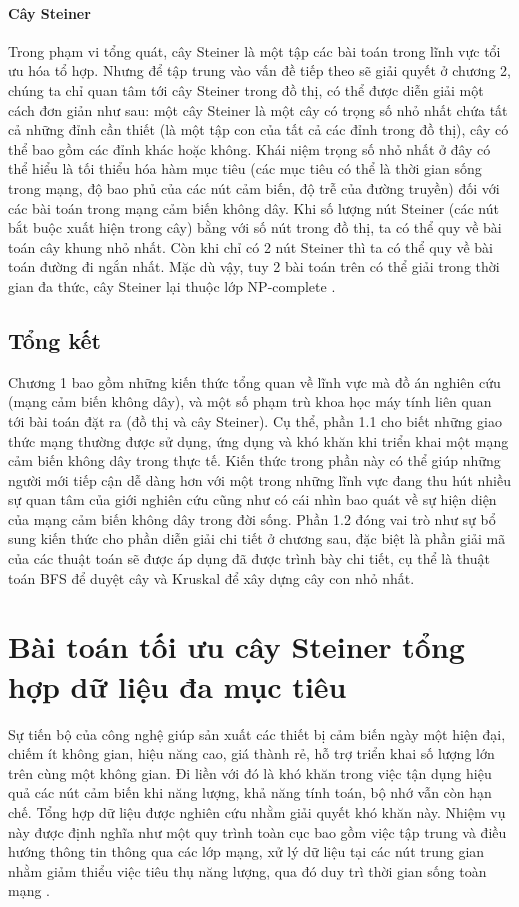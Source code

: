 \documentclass{hust}
\begin{document}
\subsubsection{Cây Steiner}
Trong phạm vi tổng quát, cây Steiner là một tập các bài toán trong lĩnh vực tổi ưu hóa tổ hợp. Nhưng để tập trung vào vấn đề tiếp theo sẽ giải quyết ở chương 2, chúng ta chỉ quan tâm tới cây Steiner trong đồ thị, có thể được diễn giải một cách đơn giản như sau: một cây Steiner là một cây có trọng số nhỏ nhất chứa tất cả những đỉnh cần thiết (là một tập con của tất cả các đỉnh trong đồ thị), cây có thể bao gồm các đỉnh khác hoặc không. Khái niệm trọng số nhỏ nhất ở đây có thể hiểu là tối thiểu hóa hàm mục tiêu (các mục tiêu có thể là thời gian sống trong mạng, độ bao phủ của các nút cảm biến, độ trễ của đường truyền) đối với các bài toán trong mạng cảm biến không dây. Khi số lượng nút Steiner (các nút bắt buộc xuất hiện trong cây) bằng với số nút trong đồ thị, ta có thể quy về bài toán cây khung nhỏ nhất. Còn khi chỉ có 2 nút Steiner thì ta có thể quy về bài toán đường đi ngắn nhất. Mặc dù vậy, tuy 2 bài toán trên có thể giải trong thời gian đa thức, cây Steiner lại thuộc lớp NP-complete \cite{karp1972reducibility}.

\section{Tổng kết}
Chương 1 bao gồm những kiến thức tổng quan về lĩnh vực mà đồ án nghiên cứu (mạng cảm biến không dây), và một số phạm trù khoa học máy tính liên quan tới bài toán đặt ra (đồ thị và cây Steiner). Cụ thể, phần 1.1 cho biết những giao thức mạng thường được sử dụng, ứng dụng và khó khăn khi triển khai một mạng cảm biến không dây trong thực tế. Kiến thức trong phần này có thể giúp những người mới tiếp cận dễ dàng hơn với một trong những lĩnh vực đang thu hút nhiều sự quan tâm của giới nghiên cứu cũng như có cái nhìn bao quát về sự hiện diện của mạng cảm biến không dây trong đời sống. Phần 1.2 đóng vai trò như sự bổ sung kiến thức cho phần diễn giải chi tiết ở chương sau, đặc biệt là phần giải mã của các thuật toán sẽ được áp dụng đã được trình bày chi tiết, cụ thể là thuật toán \gls{BFS} để duyệt cây và Kruskal để xây dựng cây con nhỏ nhất.

\chapter{Bài toán tối ưu cây Steiner tổng hợp dữ liệu đa mục tiêu}
Sự tiến bộ của công nghệ giúp sản xuất các thiết bị cảm biến ngày một hiện đại, chiếm ít không gian, hiệu năng cao, giá thành rẻ, hỗ trợ triển khai số lượng lớn trên cùng một không gian. Đi liền với đó là khó khăn trong việc tận dụng hiệu quả các nút cảm biến khi năng lượng, khả năng tính toán, bộ nhớ vẫn còn hạn chế. Tổng hợp dữ liệu được nghiên cứu nhằm giải quyết khó khăn này. Nhiệm vụ này được định nghĩa như một quy trình toàn cục bao gồm việc tập trung và điều hướng thông tin thông qua các lớp mạng, xử lý dữ liệu tại các nút trung gian nhằm giảm thiểu việc tiêu thụ năng lượng, qua đó duy trì thời gian sống toàn mạng \cite{fasolo2007network}.
\end{document}
